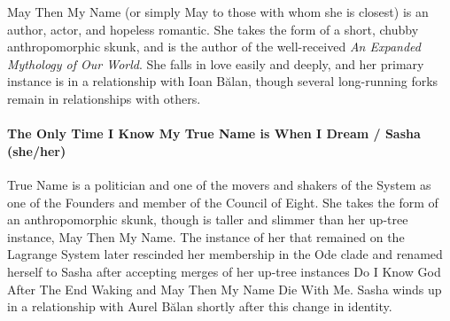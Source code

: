 May Then My Name (or simply May to those with whom she is closest) is an author, actor, and hopeless romantic. She takes the form of a short, chubby anthropomorphic skunk, and is the author of the well-received \emph{An Expanded Mythology of Our World}. She falls in love easily and deeply, and her primary instance is in a relationship with Ioan Bălan, though several long-running forks remain in relationships with others.

\begin{comment}
\emph{Appears in:}

\begin{itemize}
\tightlist
\item
  \href{https://toledot.post-self.ink}{\emph{Toledot}}
\item
  \href{https://neviim.post-self.ink}{\emph{Nevi'im}}
\item
  \href{https://mitzvot.post-self.ink}{\emph{Mitzvot} and ``Selected Letters''}
\end{itemize}
\end{comment}

\paragraph{The Only Time I Know My True Name is When I Dream / Sasha (she/her)}

True Name is a politician and one of the movers and shakers of the System as one of the Founders and member of the Council of Eight. She takes the form of an anthropomorphic skunk, though is taller and slimmer than her up-tree instance, May Then My Name. The instance of her that remained on the Lagrange System later rescinded her membership in the Ode clade and renamed herself to Sasha after accepting merges of her up-tree instances Do I Know God After The End Waking and May Then My Name Die With Me. Sasha winds up in a relationship with Aurel Bălan shortly after this change in identity.

\begin{comment}
\emph{Appears in:}

\begin{itemize}
\tightlist
\item
  \href{https://toledot.post-self.ink}{\emph{Toledot}}
\item
  \href{https://neviim.post-self.ink}{\emph{Nevi'im}}
\item
  \href{https://mitzvot.post-self.ink}{\emph{Mitzvot} and ``Selected Letters''}
\end{itemize}
\end{comment}

